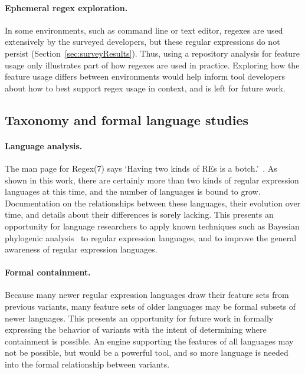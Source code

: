 \paragraph{Ephemeral regex exploration.} In some environments, such as command line or text editor, regexes are used extensively by the surveyed developers, but these regular expressions do not persist (Section~\ref{sec:surveyResults}). Thus, using a repository analysis for feature usage only illustrates part of how regexes are used in practice. Exploring how the feature usage differs between environments would help inform tool developers about how to best support regex usage in context, and is left for future work.

\subsection{Taxonomy and formal language studies}
\paragraph{Language analysis.} The man page for Regex(7) says `Having two kinds of REs is a botch.'~\citep{regexManual}.  As shown in this work, there are certainly more than two kinds of regular expression languages at this time, and the number of languages is bound to grow.  Documentation on the relationships between these languages, their evolution over time, and details about their differences is sorely lacking.  This presents an opportunity for language researchers to apply known techniques such as Bayesian phylogenic analysis~\citep{Kitchen2703} to regular expression languages, and to improve the general awareness of regular expression languages.

\paragraph{Formal containment.} Because many newer regular expression languages draw their feature sets from previous variants, many feature sets of older languages may be formal subsets of newer languages.  This presents an opportunity for future work in formally expressing the behavior of variants with the intent of determining where containment is possible.  An engine supporting the features of all languages may not be possible, but would be a powerful tool, and so more language is needed into the formal relationship between variants.



